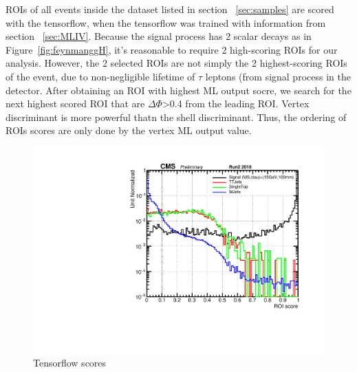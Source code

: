 ROIs of all events inside the dataset listed in section ~\ref{sec:samples} are scored with the tensorflow, when the tensorflow was trained with information from section ~\ref{sec:MLIV}.
Because the signal process has 2 scalar decays as in Figure~\ref{fig:feynmanggH}, it's reasonable to require 2 high-scoring ROIs for our analysis.
However, the 2 selected ROIs are not simply the 2 highest-scoring ROIs of the event, due to non-negligible lifetime of $\tau$ leptons (from signal process in the detector.
After obtaining an ROI with highest ML output socre, we search for the next highest scored ROI that are $\Delta\Phi$>0.4 from the leading ROI.
Vertex discriminant is more powerful thatn the shell discriminant.
Thus, the ordering of ROIs scores are only done by the vertex ML output value.

\begin{figure}[h!]
  \caption{Tensorflow scores}
  \label{fig:TensorFlow scores}
  \centering
  \includegraphics[width=0.67\linewidth]{figs/Tensorflow_Disc_mostrecent.pdf}

\end{figure}

